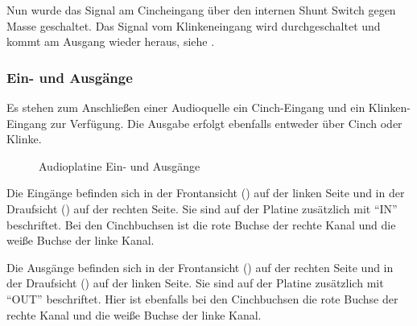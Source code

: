 
Nun wurde das Signal am Cincheingang über den internen Shunt Switch gegen Masse geschaltet. Das Signal vom Klinkeneingang wird durchgeschaltet und kommt am Ausgang wieder heraus, siehe .

\subsubsection{Ein- und Ausgänge}
Es stehen zum Anschließen einer Audioquelle ein Cinch-Eingang und ein Klinken-Eingang zur Verfügung. Die Ausgabe erfolgt ebenfalls entweder über Cinch oder Klinke.

\begin{figure}[H]
    \centering
    \qquad
    \qquad
    \caption{Audioplatine Ein- und Ausgänge}
    \label{fig:audio-io}
\end{figure}

Die Eingänge befinden sich in der Frontansicht () auf der linken Seite und in der Draufsicht () auf der rechten Seite. Sie sind auf der Platine zusätzlich mit \enquote{IN} beschriftet. Bei den Cinchbuchsen ist die rote Buchse der rechte Kanal und die weiße Buchse der linke Kanal.

Die Ausgänge befinden sich in der Frontansicht () auf der rechten Seite und in der Draufsicht () auf der linken Seite. Sie sind auf der Platine zusätzlich mit \enquote{OUT} beschriftet. Hier ist ebenfalls bei den Cinchbuchsen die rote Buchse der rechte Kanal und die weiße Buchse der linke Kanal.

